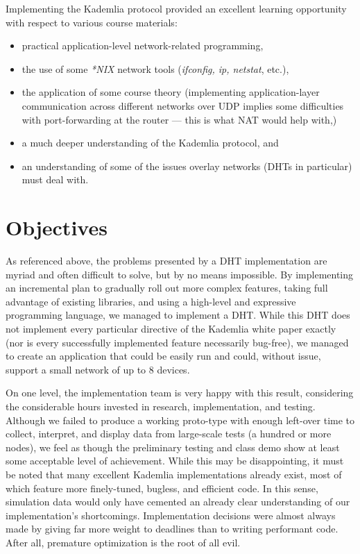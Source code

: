 \documentclass[12pt]{report}
\begin{document}
    Implementing the Kademlia protocol provided an excellent learning
    opportunity with respect to various course materials:
    \begin{itemize}
        \item practical application-level network-related programming, 
        \item the use of some \textit{*NIX} network tools (\textit{ifconfig,
            ip, netstat}, etc.), 
        \item the application of some course theory (implementing
            application-layer communication across different networks over UDP
            implies some difficulties with port-forwarding at the router ---
            this is what NAT would help with,)
        \item a much deeper understanding of the Kademlia protocol, and
        \item an understanding of some of the issues overlay networks (DHTs in
            particular) must deal with.
    \end{itemize}
   
    \section{Objectives\label{objectives}}
    As referenced above, the problems presented by a DHT implementation are
    myriad and often difficult to solve, but by no means impossible.  By implementing
    an incremental plan to gradually roll out more complex features, taking
    full advantage of existing libraries, and using a high-level and expressive
    programming language, we managed to implement a DHT.  While this DHT does
    not implement every particular directive of the Kademlia white paper
    exactly (nor is every successfully implemented feature necessarily
    bug-free), we managed to create an application that could be easily run and
    could, without issue, support a small network of up to 8 devices.

    On one level, the implementation team is very happy with this result,
    considering the considerable hours invested in research, implementation,
    and testing.  Although we failed to produce a working proto-type with
    enough left-over time to collect, interpret, and display data from
    large-scale tests (a hundred or more nodes), we feel as though the
    preliminary testing and class demo show at least some acceptable level of
    achievement.  While this may be disappointing, it must be noted that many
    excellent Kademlia implementations already exist, most of which feature
    more finely-tuned, bugless, and efficient code.  In this sense, simulation
    data would only have cemented an already clear understanding of our
    implementation's shortcomings.  Implementation decisions were almost always
    made by giving far more weight to deadlines than to writing performant
    code.  After all, premature optimization is the root of all evil.
    
\end{document}
